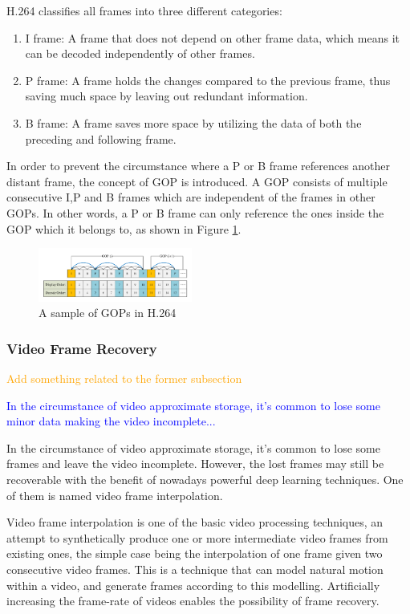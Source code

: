 \documentclass[sigconf]{acmart}
\begin{document}
H.264 classifies all frames into three different categories:
\begin{enumerate}
    \item I frame: A frame that does not depend on other frame data, which means it can be decoded independently of other frames.
    \item P frame: A frame holds the changes compared to the previous frame, thus saving much space by leaving out redundant information.
    \item B frame: A frame saves more space by utilizing the data of both the preceding and following frame.
\end{enumerate}
In order to prevent the circumstance where a P or B frame references another distant frame, the concept of GOP is introduced. A GOP consists of multiple consecutive I,P and B frames which are independent of the frames in other GOPs. In other words, a P or B frame can only reference the ones inside the GOP which it belongs to, as shown in Figure \ref{H264-IPB}.
\begin{figure}[ht]
\centering
\includegraphics[width=0.45\textwidth]{photo/H264_IPB.pdf}
\caption{A sample of GOPs in H.264}
\label{H264-IPB}
\end{figure}


\subsubsection{Video Frame Recovery}


\textcolor{orange}{Add something related to the former subsection}

\textcolor{blue}{In the circumstance of video approximate storage, it's common to lose some minor data making the video incomplete...}


In the circumstance of video approximate storage, it's common to lose some frames and leave the video incomplete. However, the lost frames may still be recoverable with the benefit of nowadays powerful deep learning techniques. One of them is named video frame interpolation.

Video frame interpolation is one of the basic video processing techniques, an attempt to synthetically produce one or more intermediate video frames from existing ones, the simple case being the interpolation of one frame given two consecutive video frames. This is a technique that can model natural motion within a video, and generate frames according to this modelling. Artificially increasing the frame-rate of videos enables the possibility of frame recovery.
\end{document}
